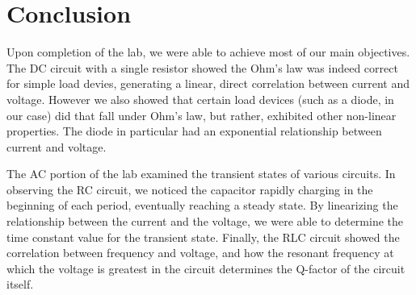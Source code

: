 \documentclass{article}
\begin{document}
\section{Conclusion}
Upon completion of the lab, we were able to achieve most of our main objectives.
The DC circuit with a single resistor showed the Ohm's law was indeed correct
for simple load devies, generating a linear, direct correlation between current
and voltage. However we also showed that certain load devices (such as a diode,
in our case) did that fall under Ohm's law, but rather, exhibited other
non-linear properties. The diode in particular had an exponential relationship
between current and voltage.

The AC portion of the lab examined the transient states of various circuits. In
observing the RC circuit, we noticed the capacitor rapidly charging in the
beginning of each period, eventually reaching a steady state. By linearizing the
relationship between the current and the voltage, we were able to determine the
time constant value for the transient state. Finally, the RLC circuit showed the
correlation between frequency and voltage, and how the resonant frequency at
which the voltage is greatest in the circuit determines the Q-factor of the
circuit itself.
\end{document}
